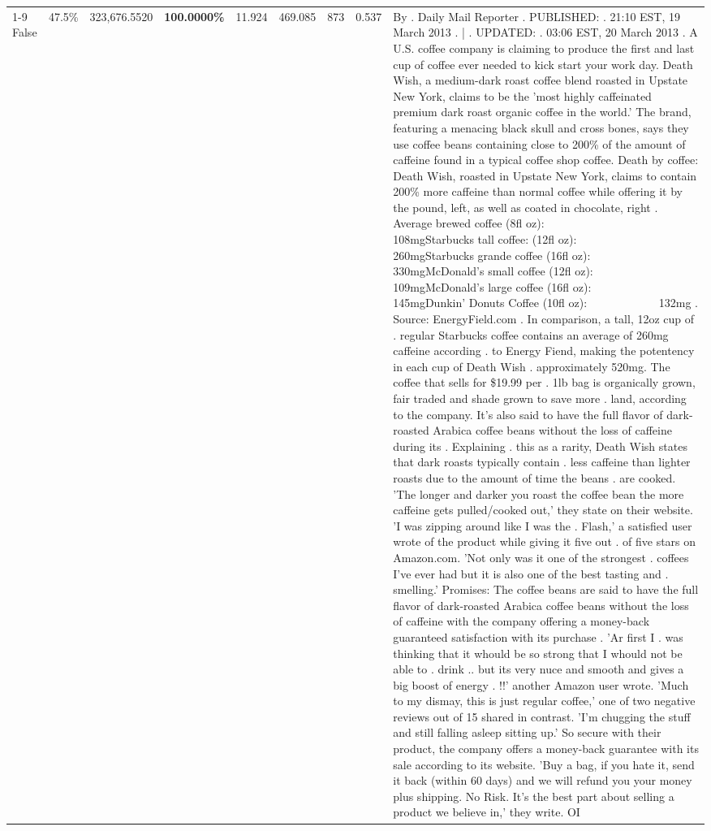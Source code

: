 \begin{table}[H]
{\begin{tabular}{lllrlllll}
\cline{1-9}
False & 47.5\% & 323,676.5520 & \bfseries \color{red} 100.0000\% & 11.924 & 469.085 & 873 & 0.537 & By . Daily Mail Reporter . PUBLISHED: . 21:10 EST, 19 March 2013 . | . UPDATED: . 03:06 EST, 20 March 2013 . A U.S. coffee company is claiming to produce the first and last cup of coffee ever needed to kick start your work day. Death Wish, a medium-dark roast coffee blend roasted in Upstate New York, claims to be the 'most highly caffeinated premium dark roast organic coffee in the world.' The brand, featuring a menacing black skull and cross bones, says they use coffee beans containing close to 200\% of the amount of caffeine found in a typical coffee shop coffee. Death by coffee: Death Wish, roasted in Upstate New York, claims to contain 200\% more caffeine than normal coffee while offering it by the pound, left, as well as coated in chocolate, right . Average brewed coffee (8fl oz):              108mgStarbucks tall coffee: (12fl oz):                260mgStarbucks grande coffee (16fl oz):         330mgMcDonald's small coffee (12fl oz):           109mgMcDonald's large coffee (16fl oz):           145mgDunkin' Donuts Coffee (10fl oz):             132mg . Source: EnergyField.com . In comparison, a tall, 12oz cup of . regular Starbucks coffee contains an average of 260mg caffeine according . to Energy Fiend, making the potentency in each cup of Death Wish . approximately 520mg. The coffee that sells for \$19.99 per . 1lb bag is organically grown, fair traded and shade grown to save more . land, according to the company. It's also said to have the full flavor of dark-roasted Arabica coffee beans without the loss of caffeine during its . Explaining . this as a rarity, Death Wish states that dark roasts typically contain . less caffeine than lighter roasts due to the amount of time the beans . are cooked. 'The longer and darker you roast the coffee bean the more caffeine gets pulled/cooked out,' they state on their website. 'I was zipping around like I was the . Flash,' a satisfied user wrote of the product while giving it five out . of five stars on Amazon.com. 'Not only was it one of the strongest . coffees I've ever had but it is also one of the best tasting and . smelling.’ Promises: The coffee beans are said to have the full flavor of dark-roasted Arabica coffee beans without the loss of caffeine with the company offering a money-back guaranteed satisfaction with its purchase . 'Ar first I . was thinking that it whould be so strong that I whould not be able to . drink .. but its very nuce and smooth and gives a big boost of energy . !!' another Amazon user wrote. 'Much to my dismay, this is just regular coffee,' one of two negative reviews out of 15 shared in contrast. 'I'm chugging the stuff and still falling asleep sitting up.' So secure with their product, the company offers a money-back guarantee with its sale according to its website. 'Buy a bag, if you hate it, send it back (within 60 days) and we will refund you your money plus shipping. No Risk. It’s the best part about selling a product we believe in,' they write. OI \\

\end{tabular}}
\end{table}
